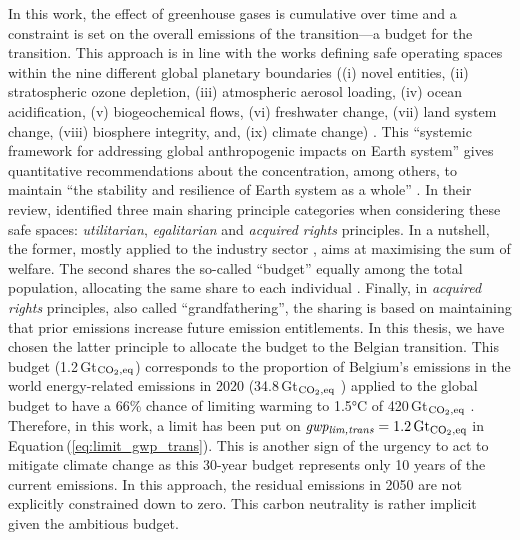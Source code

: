 In this work, the effect of greenhouse gases is cumulative over time and a constraint is set on the overall emissions of the transition---a  budget for the transition. This approach is in line with the works defining safe operating spaces within the nine different global planetary boundaries (\ie (i) novel entities, (ii) stratospheric ozone depletion, (iii) atmospheric aerosol loading, (iv) ocean acidification, (v) biogeochemical flows, (vi) freshwater change, (vii) land system change, (viii) biosphere integrity, and, (ix) climate change) \cite{richardson2023earth,steffen2015planetary,rockstrom2009safe}. This ``systemic framework for addressing global anthropogenic impacts on Earth system'' gives quantitative recommendations about the  concentration, among others, to maintain ``the stability and resilience of Earth system as a whole'' \cite{richardson2023earth}. In their review, \citet{ryberg2020downscaling} identified three main sharing principle categories when considering these safe spaces: \ie \textit{utilitarian}, \textit{egalitarian} and \textit{acquired rights} principles. In a nutshell, the former, mostly applied to the industry sector \cite{ryberg2018bring,brejnrod2017absolute}, aims at maximising the sum of welfare. The second shares the so-called ``budget'' equally among the total population, allocating the same share to each individual \cite{hoff2017bringing,o2018good}. Finally, in \textit{acquired rights} principles, also called ``grandfathering'', the sharing is based on \og maintaining that prior emissions increase future emission entitlements\fg  \cite{knight2013grandfathering}. In this thesis, we have chosen the latter principle to allocate the  budget to the Belgian transition. This budget (1.2\,Gt$_{\ce{CO2},\text{eq}}$) corresponds to the proportion of Belgium's emissions in the world energy-related emissions in 2020 (34.8\,Gt$_{\ce{CO2},\text{eq}}$ \cite{ourworldindata_CO2_world}) applied to the global budget to have a 66\% chance of limiting warming to 1.5°C of 420\,Gt$_{\ce{CO2},\text{eq}}$ \cite{IPCC_CO2_budget}. Therefore, in this work, a limit has been put on $\emph{gwp\textsubscript{lim,trans}}=1.2\,\text{Gt}_{\ce{CO2},\text{eq}}$ in Equation\,(\ref{eq:limit_gwp_trans}). This is another sign of the urgency to act to mitigate climate change as this 30-year budget represents only 10 years of the current emissions.  In this approach, the residual emissions in 2050 are not explicitly constrained down to zero. This carbon neutrality is rather implicit given the ambitious  budget.

